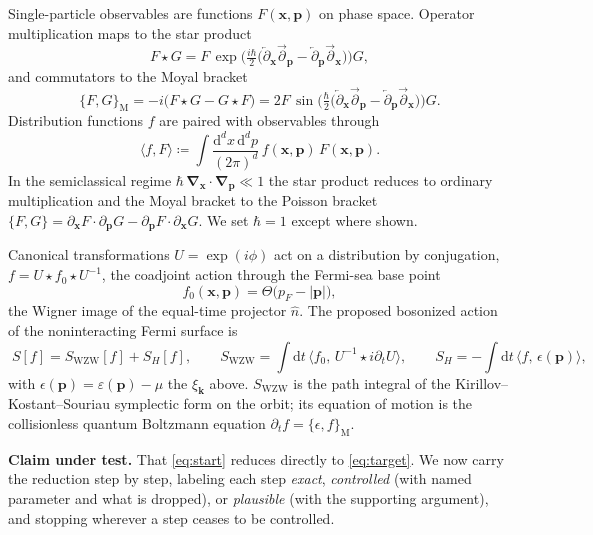 \documentclass[11pt]{article}
\theoremstyle{remark}
\begin{document}
Single-particle observables are functions $F(\boldsymbol{x},\boldsymbol{p})$ on phase space.
Operator multiplication maps to the star product
\begin{equation}
\label{eq:star}
F\star G=F\,\exp\!\Big(\tfrac{i\hbar}{2}\big(
\overleftarrow{\partial}_{\boldsymbol{x}}\overrightarrow{\partial}_{\boldsymbol{p}}
-\overleftarrow{\partial}_{\boldsymbol{p}}\overrightarrow{\partial}_{\boldsymbol{x}}\big)\Big)G,
\end{equation}
and commutators to the Moyal bracket
\[
\{F,G\}_{\mathrm{M}}=-i\big(F\star G-G\star F\big)
=2F\,\sin\!\Big(\tfrac{\hbar}{2}\big(
\overleftarrow{\partial}_{\boldsymbol{x}}\overrightarrow{\partial}_{\boldsymbol{p}}
-\overleftarrow{\partial}_{\boldsymbol{p}}\overrightarrow{\partial}_{\boldsymbol{x}}\big)\Big)G.
\]
Distribution functions $f$ are paired with observables through
\[
\langle f,F\rangle\coloneqq\int\frac{\mathrm{d}^dx\,\mathrm{d}^dp}{(2\pi)^d}\,
f(\boldsymbol{x},\boldsymbol{p})\,F(\boldsymbol{x},\boldsymbol{p}).
\]
In the semiclassical regime $\hbar\,\boldsymbol{\nabla}_{\boldsymbol{x}}\!\cdot\!
\boldsymbol{\nabla}_{\boldsymbol{p}}\ll1$ the star product reduces to ordinary
multiplication and the Moyal bracket to the Poisson bracket
$\{F,G\}=\partial_{\boldsymbol{x}}F\!\cdot\!\partial_{\boldsymbol{p}}G
-\partial_{\boldsymbol{p}}F\!\cdot\!\partial_{\boldsymbol{x}}G$. We set $\hbar=1$ except
where shown.

Canonical transformations $U=\exp(i\phi)$ act on a distribution by conjugation,
$f=U\star f_0\star U^{-1}$, the coadjoint action through the Fermi-sea base point
\[
f_0(\boldsymbol{x},\boldsymbol{p})=\Theta\!\big(p_F-|\boldsymbol{p}|\big),
\]
the Wigner image of the equal-time projector $\hat n$. The proposed bosonized action of
the noninteracting Fermi surface is
\begin{equation}
\label{eq:target}
\boxed{\;
S[f]=S_{\mathrm{WZW}}[f]+S_H[f],\qquad
S_{\mathrm{WZW}}=\int\mathrm{d}t\,\big\langle f_0,\,U^{-1}\!\star i\partial_t U\big\rangle,
\qquad
S_H=-\int\mathrm{d}t\,\big\langle f,\,\epsilon(\boldsymbol{p})\big\rangle,\;}
\end{equation}
with $\epsilon(\boldsymbol{p})=\varepsilon(\boldsymbol{p})-\mu$ the $\xi_{\boldsymbol{k}}$
above. $S_{\mathrm{WZW}}$ is the path integral of the Kirillov--Kostant--Souriau
symplectic form on the orbit; its equation of motion is the collisionless quantum
Boltzmann equation $\partial_t f=\{\epsilon,f\}_{\mathrm{M}}$.

\medskip
\noindent\textbf{Claim under test.} That \eqref{eq:start} reduces directly to
\eqref{eq:target}. We now carry the reduction step by step, labeling each step
\emph{exact}, \emph{controlled} (with named parameter and what is dropped), or
\emph{plausible} (with the supporting argument), and stopping wherever a step ceases to
be controlled.
\end{document}
